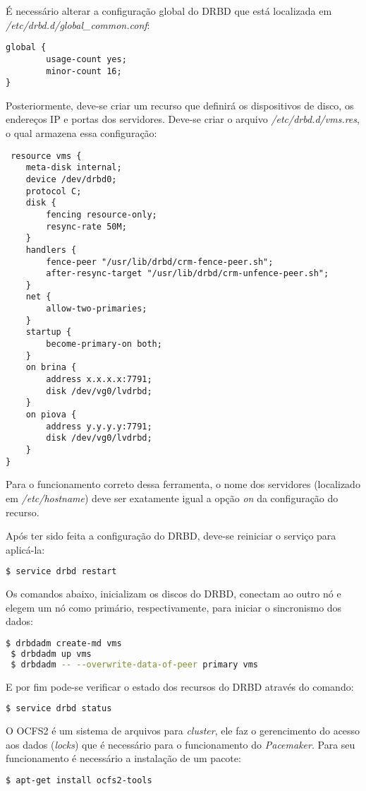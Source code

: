 É necessário alterar a configuração global do \ac{DRBD} que está localizada em \textit{/etc/drbd.d/global\_common.conf}:
\begin{lstlisting}
global {
        usage-count yes;
        minor-count 16;
}
\end{lstlisting}

Posteriormente, deve-se criar um recurso que definirá os dispositivos de disco, os endereços \ac{IP} e portas dos servidores.
Deve-se criar o arquivo \textit{/etc/drbd.d/vms.res}, o qual armazena essa configuração:
\begin{lstlisting}
 resource vms {
    meta-disk internal;
    device /dev/drbd0;
    protocol C;
    disk {
        fencing resource-only;
        resync-rate 50M;
    }
    handlers {
        fence-peer "/usr/lib/drbd/crm-fence-peer.sh";
        after-resync-target "/usr/lib/drbd/crm-unfence-peer.sh";
    }
    net {
        allow-two-primaries;
    }
    startup {
        become-primary-on both;
    }
    on brina {
        address x.x.x.x:7791;
        disk /dev/vg0/lvdrbd;
    }
    on piova {
        address y.y.y.y:7791;
        disk /dev/vg0/lvdrbd;
    }
}
\end{lstlisting}

Para o funcionamento correto dessa ferramenta, o nome dos servidores (localizado em \textit{/etc/hostname}) deve ser exatamente igual a opção
\textit{on} da configuração do recurso.

Após ter sido feita a configuração do \ac{DRBD}, deve-se reiniciar o serviço para aplicá-la:
\begin{lstlisting}[language=bash]
 $ service drbd restart 
\end{lstlisting}

Os comandos abaixo, inicializam os discos do \ac{DRBD}, conectam ao outro nó e elegem um nó como primário, respectivamente, para iniciar o 
sincronismo dos dados:
\begin{lstlisting}[language=bash]
 $ drbdadm create-md vms
 $ drbdadm up vms
 $ drbdadm -- --overwrite-data-of-peer primary vms
\end{lstlisting}

E por fim pode-se verificar o estado dos recursos do \ac{DRBD} através do comando:
\begin{lstlisting}[language=bash]
 $ service drbd status
\end{lstlisting}

O \ac{OCFS2} é um sistema de arquivos para \textit{cluster}, ele faz o gerencimento do acesso aos dados (\textit{locks}) que é necessário para o 
funcionamento do \textit{Pacemaker}. Para seu funcionamento é necessário a instalação de um pacote:
\begin{lstlisting}[language=bash]
 $ apt-get install ocfs2-tools
\end{lstlisting}

